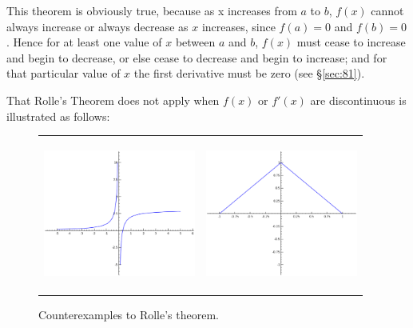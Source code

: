 This theorem is obviously true, because as x 
increases from $a$ to $b$, $f(x)$ cannot always increase or 
always decrease as $x$ increases, since $f(a) = 0$ and $f(b) = 0$. 
Hence for at least one value of $x$ between $a$ and $b$, 
$f(x)$ must cease to increase and begin to decrease, 
or else cease to decrease and begin to increase; and for 
that particular value of $x$ the first derivative must 
be zero (see \S \ref{sec:81}). %

That Rolle's Theorem does not apply when $f(x)$ or $f'(x)$ 
are discontinuous is illustrated as follows:

\begin{figure}[h!]
\begin{tabular}{cc}
\includegraphics[height=5cm,width=5cm]{rolles-theorem4a.eps}
&
\includegraphics[height=5cm,width=5cm]{rolles-theorem4b.eps}
\end{tabular}
\caption{Counterexamples to Rolle's theorem.}
\label{fig:rolles-theorem2}
\end{figure}

